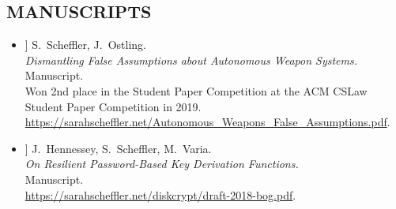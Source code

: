 \documentclass{res}
\begin{document}
\begin{resume}
\vspace{0.25in}

%
%

\vspace{0.25in}

\section{MANUSCRIPTS}
\vspace{0.25in}

\newcommand{\autonomousWeapons}{[15]\xspace}
\newcommand{\bog}{[16]\xspace}

\begin{itemize}
\item[\autonomousWeapons] S.~Scheffler, J.~Ostling. \\
\emph{Dismantling False Assumptions about Autonomous Weapon Systems.} \\
Manuscript.  \\
Won 2nd place in the Student Paper Competition at the ACM CSLaw Student Paper Competition in 2019. \\
\url{https://sarahscheffler.net/Autonomous_Weapons_False_Assumptions.pdf}.

\item[\bog] J.~Hennessey, S.~Scheffler, M.~Varia. \\
\emph{On Resilient Password-Based Key Derivation Functions.} \\
Manuscript.  \\
\url{https://sarahscheffler.net/diskcrypt/draft-2018-bog.pdf}.
\end{itemize}

\vspace{0.25in}


\end{resume}
\end{document}
